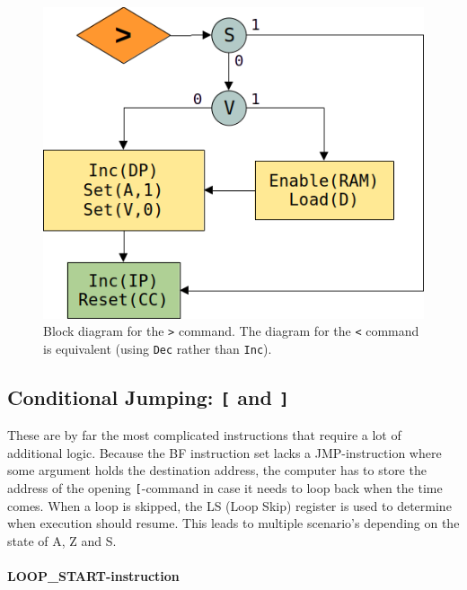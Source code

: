 \documentclass{article}
\begin{document}
\begin{figure}[H]
  \centering
  \includegraphics[scale=0.3]{img/rightalg}
  \caption{Block diagram for the \texttt{>} command. The diagram for the \texttt{<} command is equivalent (using \texttt{Dec} rather than \texttt{Inc}).}
  \label{fig:rightalg}
\end{figure}

\subsection{Conditional Jumping: \texttt{[} and \texttt{]}}
These are by far the most complicated instructions that require a lot of additional logic. Because the BF instruction set lacks a JMP-instruction where some argument holds the destination address, the computer has to store the address of the opening \texttt{[}-command in case it needs to loop back when the time comes. When a loop is skipped, the LS (Loop Skip) register is used to determine when execution should resume. This leads to multiple scenario's depending on the state of A, Z and S.
  
  \paragraph{LOOP\_START-instruction} 
  
\end{document}
